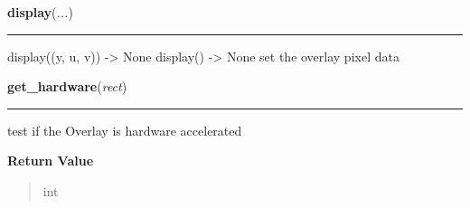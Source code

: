     \label{pygame:Overlay:display}

    \vspace{0.5ex}

\hspace{.8\funcindent}\begin{boxedminipage}{\funcwidth}

    \raggedright \textbf{display}(\textit{...})

    \vspace{-1.5ex}

    \rule{\textwidth}{0.5\fboxrule}
\setlength{\parskip}{2ex}
    display((y, u, v)) -{\textgreater} None display() -{\textgreater} None 
    set the overlay pixel data

\setlength{\parskip}{1ex}
    \end{boxedminipage}

    \label{pygame:Overlay:get_hardware}

    \vspace{0.5ex}

\hspace{.8\funcindent}\begin{boxedminipage}{\funcwidth}

    \raggedright \textbf{get\_hardware}(\textit{rect})

    \vspace{-1.5ex}

    \rule{\textwidth}{0.5\fboxrule}
\setlength{\parskip}{2ex}
    test if the Overlay is hardware accelerated

\setlength{\parskip}{1ex}
      \textbf{Return Value}
    \vspace{-1ex}

      \begin{quote}
      int

      \end{quote}

    \end{boxedminipage}

    \label{pygame:Overlay:set_location}

    \vspace{0.5ex}

